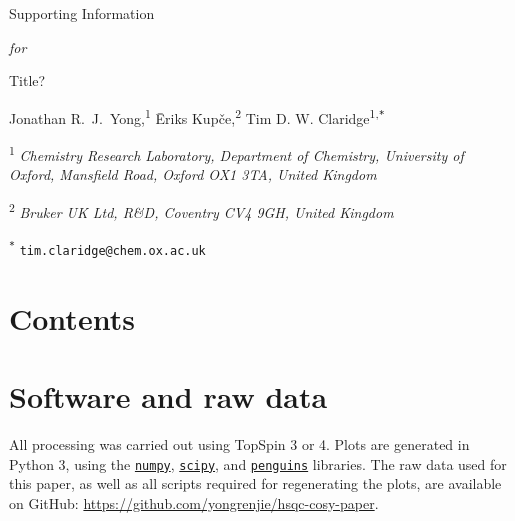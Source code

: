 \documentclass[a4paper,12pt]{article}
\newcommand{\me}{Jonathan R.\ J.\ Yong}
\newcommand{\eriks}{{\=E}riks Kup{\v{c}}e}
\newcommand{\tim}{Tim D. W. Claridge}
\newcommand{\articletitle}{\todo{Title?}}
\newcommand{\crl}{Chemistry Research Laboratory, Department of Chemistry, University of Oxford, Mansfield Road, Oxford OX1 3TA, United Kingdom}
\newcommand{\brukeruk}{Bruker UK Ltd, R\&D, Coventry CV4 9GH, United Kingdom}
\newcommand{\todo}[1]{{\color{OrangeRed}#1}}
\begin{document}

\clearpage
\begin{refsection}
\newcommand{\sectionbreak}{\clearpage}
\renewcommand*{\thefigure}{S\arabic{figure}}
\renewcommand*{\thesection}{S\arabic{section}}
\renewcommand*{\thetable}{S\arabic{table}}
\renewcommand*{\thepage}{S\arabic{page}}
\setcounter{page}{1}
\setcounter{figure}{0}
\setcounter{section}{0}
\setcounter{table}{0}
\onehalfspacing

\hspace{0pt}
\vfill
\begin{center}
    \huge
    Supporting Information

    \vspace{0.3cm}

    \textit{for}

    \vspace{0.3cm}

    \articletitle{}

    \vspace{0.6cm}

    \Large \me{},\textsuperscript{1} \eriks{},\textsuperscript{2} \tim{}\textsuperscript{1,\texttt{*}}

    \vspace{0.6cm}

    \large \textsuperscript{1} \textit{\crl{}}

    \textsuperscript{2} \textit{\brukeruk{}}

    \textsuperscript{\texttt{*}} \texttt{tim.claridge@chem.ox.ac.uk}

\end{center}
\vfill

\newpage
\section*{Contents}

\startcontents[si]
\vfill
\hspace{0pt}
\newpage

\section{Software and raw data}

All processing was carried out using TopSpin 3 or 4.
Plots are generated in Python 3, using the \href{https://github.com/numpy/numpy}{\texttt{numpy}}, \href{https://github.com/scipy/scipy}{\texttt{scipy}}, and \href{https://github.com/yongrenjie/penguins}{\texttt{penguins}} libraries.
The raw data used for this paper, as well as all scripts required for regenerating the plots, are available on GitHub: \url{https://github.com/yongrenjie/hsqc-cosy-paper}.


\clearpage    %

\end{refsection}
\end{document}
